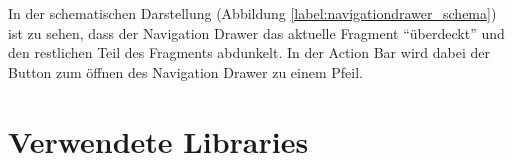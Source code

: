In der schematischen Darstellung (Abbildung \ref{label:navigationdrawer_schema}) ist zu sehen, dass der Navigation Drawer das aktuelle Fragment \enquote{überdeckt} und den restlichen Teil des Fragments abdunkelt. In der Action Bar wird dabei der Button zum öffnen des Navigation Drawer zu einem Pfeil.

\section{Verwendete Libraries}